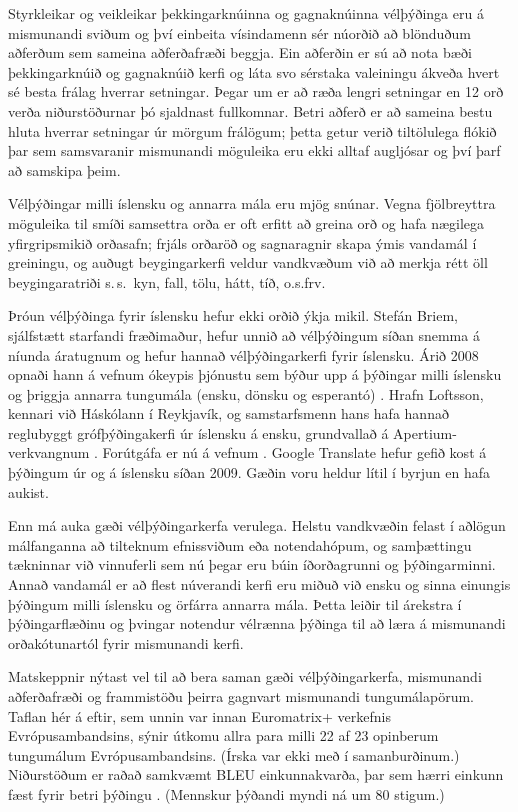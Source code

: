 \documentclass{../../metanetpaper}
\begin{document}
\begin{multicols}{2}
Styrkleikar og veikleikar þekkingarknúinna og gagnaknúinna vélþýðinga eru á mismunandi sviðum og því einbeita vísindamenn sér núorðið að blönduðum aðferðum sem sameina aðferðafræði beggja. Ein aðferðin er sú að nota bæði þekkingarknúið og gagnaknúið kerfi og láta svo sérstaka valeiningu ákveða hvert sé besta frálag hverrar setningar. Þegar um er að ræða lengri setningar en 12 orð verða niðurstöðurnar þó sjaldnast fullkomnar. Betri aðferð er að sameina bestu hluta hverrar setningar úr mörgum frálögum; þetta getur verið tiltölulega flókið þar sem samsvaranir mismunandi möguleika eru ekki alltaf augljósar og því þarf að samskipa þeim.


Vélþýðingar milli íslensku og annarra mála eru mjög snúnar. Vegna fjölbreyttra möguleika til smíði samsettra orða er oft erfitt að greina orð og hafa nægilega yfirgripsmikið orðasafn; frjáls orðaröð og sagnaragnir skapa ýmis vandamál í greiningu, og auðugt beygingarkerfi veldur vandkvæðum við að merkja rétt öll beygingaratriði s.\,s.~kyn, fall, tölu, hátt, tíð, o.s.frv.

Þróun vélþýðinga fyrir íslensku hefur ekki orðið ýkja mikil. Stefán Briem, sjálfstætt starfandi fræðimaður, hefur unnið að vélþýðingum síðan snemma á níunda áratugnum og hefur hannað vélþýðingarkerfi fyrir íslensku. Árið 2008 opnaði hann á vefnum ókeypis þjónustu sem býður upp á þýðingar milli íslensku og þriggja annarra tungumála (ensku, dönsku og esperantó) \cite{tut1}. Hrafn Loftsson, kennari við Háskólann í Reykjavík, og samstarfsmenn hans hafa hannað reglubyggt grófþýðingakerfi úr íslensku á ensku, grundvallað á Apertium-verkvangnum \cite{ape1}. Forútgáfa er nú á vefnum \cite{ape2}. Google Translate hefur gefið kost á þýðingum úr og á íslensku síðan 2009. Gæðin voru heldur lítil í byrjun en hafa aukist.

Enn má auka gæði vélþýðingarkerfa verulega. Helstu vandkvæðin felast í aðlögun málfanganna að tilteknum efnissviðum eða notendahópum, og samþættingu tækninnar við vinnuferli sem nú þegar eru búin íðorðagrunni og þýðingarminni. Annað vandamál er að flest núverandi kerfi eru miðuð við ensku og sinna einungis þýðingum milli íslensku og örfárra annarra mála. Þetta leiðir til árekstra í þýðingarflæðinu og þvingar notendur vélrænna þýðinga til að læra á mismunandi orðakótunartól fyrir mismunandi kerfi.

Matskeppnir nýtast vel til að bera saman gæði vélþýðingarkerfa, mismunandi aðferðafræði og frammistöðu þeirra gagnvart mismunandi tungumálapörum. Taflan hér á eftir, sem unnin var innan Euromatrix+ verkefnis Evrópusambandsins, sýnir útkomu allra para milli 22 af 23 opinberum tungumálum Evrópusambandsins. (Írska var ekki með í samanburðinum.) Niðurstöðum er raðað samkvæmt BLEU einkunnakvarða, þar sem hærri einkunn fæst fyrir betri þýðingu \cite{bleu1}.  (Mennskur þýðandi myndi ná um 80 stigum.)


\end{multicols}
\end{document}
